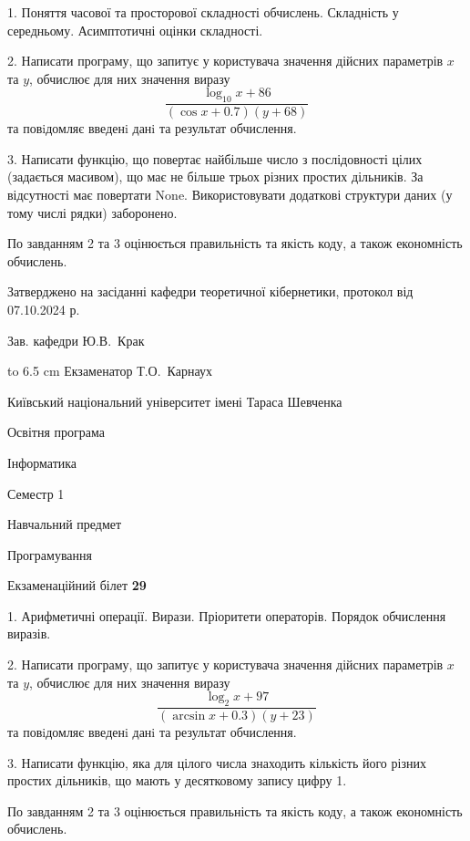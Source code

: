 \documentclass[12pt, ukrainian]{article}
\begin{document}
{%
1. Поняття часової та просторової складності обчислень. Складність у середньому. Асимптотичні оцінки складності.%
\par
2. Написати програму, що запитує у користувача значення дійсних параметрів $x$ та $y$, обчислює для них значення виразу 
$$\frac{\log_{10} x + 86}{(\cos x + 0.7) (y + 68)}$$ 
та повiдомляє введенi данi та результат обчислення.

\par
3. Написати функцію, що повертає найбільше число з послідовності цілих (задається масивом), що має не більше трьох різних простих дільників. За відсутності має повертати None. Використовувати додаткові структури даних (у тому числі рядки) заборонено.

По завданням 2 та 3 оцінюється правильність та якість коду, а також економність обчислень.

}
{\smallskip\smallskip \begin {scriptsize} Затверджено на засіданні кафедри теоретичної кібернетики, протокол   від   07.10.2024 р.\par\smallskip\smallskip\smallskip\smallskip
{\parbox {6.5 cm} {Зав. кафедри \dotfill Ю.В.~Крак}}\hspace {0.7cm} {\hbox to 6.5 cm { Екзаменатор \dotfill Т.О.~Карнаух}} \end{scriptsize}}
\vspace{0.9cm}
{{\begin {scriptsize}\par
{ \center  Київський національний університет імені Тараса Шевченка \par}
{\parbox {5 cm}{Освітня програма \hfill}{\parbox {7 cm}{Інформатика\hfill}}\parbox {6 cm}{\hfill Семестр 1}}\par
{\parbox {5 cm} {Навчальний предмет \hfill}\parbox {7 cm}{Програмування \hfill}\parbox {6cm}{\hfill}\par}\vspace{-15pt} \end{scriptsize}}{\center Екзаменаційний білет \No \textbf { 29 }\par}}
{%
1. Арифметичні операції. Вирази. Пріоритети операторів. Порядок обчислення виразів.%
\par
2. Написати програму, що запитує у користувача значення дійсних параметрів $x$ та $y$, обчислює для них значення виразу 
$$\frac{\log_{2} x + 97}{(\arcsin x + 0.3) (y + 23)}$$ 
та повiдомляє введенi данi та результат обчислення.

\par
3. Написати функцію, яка для цілого числа знаходить кількість його різних простих дільників, що мають у десятковому запису цифру 1.

По завданням 2 та 3 оцінюється правильність та якість коду, а також економність обчислень.

}
\end{document}
